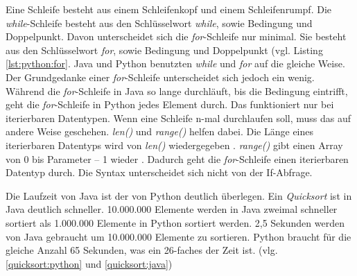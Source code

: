 Eine Schleife besteht aus einem Schleifenkopf und einem Schleifenrumpf. Die \textit{while}-Schleife besteht aus den Schlüsselwort \textit{while}, sowie Bedingung und Doppelpunkt. Davon unterscheidet sich die \textit{for}-Schleife nur minimal. Sie besteht aus den Schlüsselwort \textit{for}, sowie Bedingung und Doppelpunkt (vgl. Listing \ref{lst:python:for}. Java und Python benutzten \textit{while} und \textit{for} auf die gleiche Weise. Der Grundgedanke einer \textit{for}-Schleife unterscheidet sich jedoch ein wenig. Während die \textit{for}-Schleife in Java so lange durchläuft, bis die Bedingung eintrifft, geht die \textit{for}-Schleife in Python jedes Element durch. Das funktioniert nur bei iterierbaren Datentypen. Wenn eine Schleife n-mal durchlaufen soll, muss das auf andere Weise geschehen. \textit{len()} und \textit{range()} helfen dabei. Die Länge eines iterierbaren Datentyps wird von \textit{len()} wiedergegeben \cite{w3school_len}. \textit{range()} gibt einen Array von 0 bis Parameter – 1 wieder \cite{w3school_range}. Dadurch geht die \textit{for}-Schleife einen iterierbaren Datentyp durch. Die Syntax unterscheidet sich nicht von der If-Abfrage. \cite{Python3:Buch}\cite{Louis:2010}\par
Die Laufzeit von Java ist der von Python deutlich überlegen. Ein \textit{Quicksort} ist in Java deutlich schneller. 10.000.000 Elemente werden in Java zweimal schneller sortiert als 1.000.000 Elemente in Python sortiert werden. 2,5 Sekunden werden von Java gebraucht um 10.000.000 Elemente zu sortieren. Python braucht für die gleiche Anzahl 65 Sekunden, was ein 26-faches der Zeit ist. (vlg. \ref{quicksort:python} und \ref{quicksort:java})
